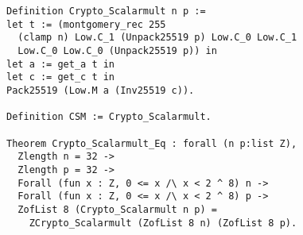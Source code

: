 \documentclass{article}
\begin{document}
\newpage

\begin{lstlisting}[language=Coq]
Definition Crypto_Scalarmult n p :=
let t := (montgomery_rec 255
  (clamp n) Low.C_1 (Unpack25519 p) Low.C_0 Low.C_1
  Low.C_0 Low.C_0 (Unpack25519 p)) in
let a := get_a t in
let c := get_c t in
Pack25519 (Low.M a (Inv25519 c)).

Definition CSM := Crypto_Scalarmult.

Theorem Crypto_Scalarmult_Eq : forall (n p:list Z),
  Zlength n = 32 ->
  Zlength p = 32 ->
  Forall (fun x : Z, 0 <= x /\ x < 2 ^ 8) n ->
  Forall (fun x : Z, 0 <= x /\ x < 2 ^ 8) p ->
  ZofList 8 (Crypto_Scalarmult n p) =
    ZCrypto_Scalarmult (ZofList 8 n) (ZofList 8 p).
\end{lstlisting}
\end{document}
